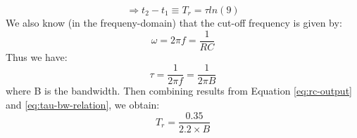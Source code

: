 \documentclass[11pt]{article}
\begin{document}
\begin{equation}\label{eq:risetime-tau-relation}
    \Rightarrow t_2 - t_1 \equiv T_r = \tau ln(9)
\end{equation}
We also know (in the frequeny-domain) that the cut-off frequency is given by:
$$
\omega = 2\pi f = \frac{1}{RC}
$$ 
Thus we have:
\begin{equation}\label{eq:tau-bw-relation}
    \tau = \frac{1}{2\pi f} = \frac{1}{2\pi B}
\end{equation}
where B is the bandwidth. Then combining results from Equation \ref{eq:rc-output} and \ref{eq:tau-bw-relation}, we obtain:
\begin{equation}\label{eq:risetime-BW-relation}
    T_r = \frac{0.35}{2.2\times B}
\end{equation}

\newpage

\end{document}
